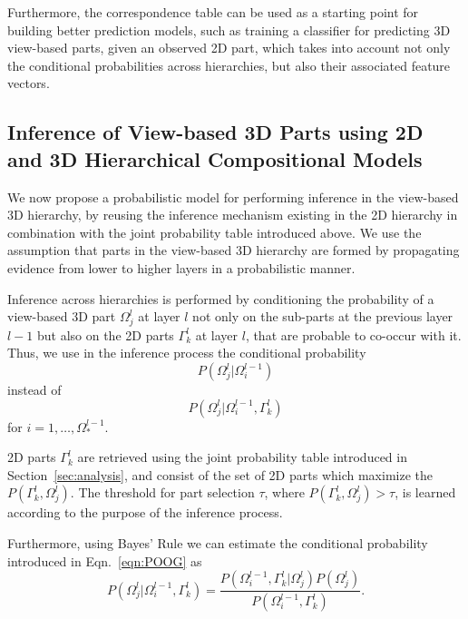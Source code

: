 \documentclass[runningheads]{llncs}
\begin{document}
Furthermore, the correspondence table can be used as a starting point for building better prediction models, such as training a classifier for predicting 3D view-based parts, given an observed 2D part, which takes into account not only the conditional probabilities across hierarchies, but also their associated feature vectors.

\subsection{Inference of View-based 3D Parts using 2D and 3D Hierarchical Compositional Models}
\label{sec:inference}

We now propose a probabilistic model for performing inference in the view-based 3D hierarchy, by reusing the inference mechanism existing in the 2D hierarchy in combination with the joint probability table introduced above.
We use the assumption that parts in the view-based 3D hierarchy are formed by propagating evidence from lower to higher layers in a probabilistic manner. 

Inference across hierarchies is performed by conditioning the probability of a view-based 3D part $\Omega_j^{l}$ at layer $l$ not only on the sub-parts at the previous layer $l-1$ but also on the 2D parts $\Gamma_k^l$ at layer $l$, that are probable to co-occur with it. Thus, we use in the inference process the conditional probability
\begin{equation}
 P(\Omega_j^{l} \vert \Omega_i^{l-1})
  \label{eqn:POO}
\end{equation}
instead of
\begin{equation}
  P(\Omega_j^{l} \vert \Omega_i^{l-1},\Gamma_k^l)
  \label{eqn:POOG}
\end{equation}
for $i=1,\dots,\Omega_*^{l-1}$.

2D parts $\Gamma_k^l$ are retrieved using the joint probability table introduced in Section~\ref{sec:analysis}, and consist of the set of 2D parts which maximize the $P(\Gamma_k^l,\Omega_j^l)$. The threshold for part selection $\tau$, where $P(\Gamma_k^l,\Omega_j^l)>\tau$, is learned according to the purpose of the inference process.

Furthermore, using Bayes' Rule we can estimate the conditional probability introduced in Eqn.~\ref{eqn:POOG} as
\begin{equation}
  P(\Omega_j^{l} \vert \Omega_i^{l-1},\Gamma_k^l) = \frac{P(\Omega_i^{l-1},\Gamma_k^l \vert \Omega_j^{l})P(\Omega_j^{l})}{P(\Omega_i^{l-1},\Gamma_k^l)}.
  \label{eqn:POOG.Bayes}
\end{equation}
\end{document}
